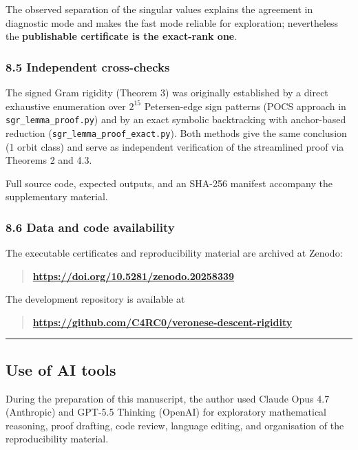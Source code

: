 \documentclass[
]{article}
\begin{document}
The observed separation of the singular values explains the agreement in
diagnostic mode and makes the fast mode reliable for exploration;
nevertheless the \textbf{publishable certificate is the exact-rank one}.

\subsubsection{8.5 Independent
cross-checks}\label{independent-cross-checks}

The signed Gram rigidity (Theorem 3) was originally established by a
direct exhaustive enumeration over \(2^{15}\) Petersen-edge sign
patterns (POCS approach in \texttt{sgr\_lemma\_proof.py}) and by an
exact symbolic backtracking with anchor-based reduction
(\texttt{sgr\_lemma\_proof\_exact.py}). Both methods give the same
conclusion (1 orbit class) and serve as independent verification of the
streamlined proof via Theorems 2 and 4.3.

Full source code, expected outputs, and an SHA-256 manifest accompany
the supplementary material.

\subsubsection{8.6 Data and code
availability}\label{data-and-code-availability}

The executable certificates and reproducibility material are archived at
Zenodo:

\begin{quote}
\textbf{\url{https://doi.org/10.5281/zenodo.20258339}}
\end{quote}

The development repository is available at

\begin{quote}
\textbf{\url{https://github.com/C4RC0/veronese-descent-rigidity}}
\end{quote}

\begin{center}\rule{0.5\linewidth}{0.5pt}\end{center}

\subsection{Use of AI tools}\label{use-of-ai-tools}

During the preparation of this manuscript, the author used Claude Opus
4.7 (Anthropic) and GPT-5.5 Thinking (OpenAI) for exploratory
mathematical reasoning, proof drafting, code review, language editing,
and organisation of the reproducibility material.
\end{document}
